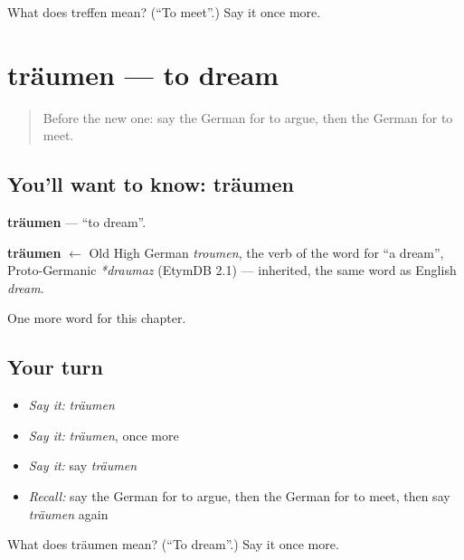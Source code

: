 \begin{tcolorbox}[breakable,colback=teal!4,colframe=teal!35!black,title={Before you move on}]
What does treffen mean? (\textquotedblleft{}To meet\textquotedblright{}.) Say it once more.
\end{tcolorbox}
\section[träumen]{träumen — to dream}

\label{lesson:GE-C151-traeumen}



\begin{quote}
Before the new one: say the German for to argue, then the German for to meet.
\end{quote}

\subsection*{You'll want to know: träumen}
\textbf{träumen} — \textquotedblleft{}to dream\textquotedblright{}.

\begin{cousinweb}
\textbf{träumen} $\leftarrow$ Old High German \emph{troumen}, the verb of the word for \textquotedblleft{}a dream\textquotedblright{}, Proto-Germanic \emph{*draumaz} (EtymDB 2.1) — inherited, the same word as English \emph{dream}.
\end{cousinweb}

\begin{grammarlens}[title={What you've built}]
One more word for this chapter.
\end{grammarlens}

\subsection*{Your turn}
\begin{itemize}
\raggedright
  \item \emph{Say it:} \emph{träumen}
  \item \emph{Say it:} \emph{träumen}, once more
  \item \emph{Say it:} say \emph{träumen}
  \item \emph{Recall:} say the German for to argue, then the German for to meet, then say \emph{träumen} again
\end{itemize}

\begin{tcolorbox}[breakable,colback=teal!4,colframe=teal!35!black,title={Before you move on}]
What does träumen mean? (\textquotedblleft{}To dream\textquotedblright{}.) Say it once more.
\end{tcolorbox}
